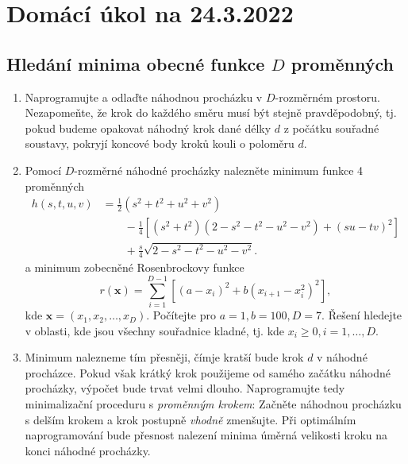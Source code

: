 \documentclass[a4paper,11pt,twoside]{article}
\def\vector#1{\boldsymbol{#1}}								%
\begin{document}
\section*{Domácí úkol na 24.3.2022}
\subsection*{Hledání minima obecné funkce $D$ proměnných}
\begin{enumerate}
    \item Naprogramujte a odlaďte náhodnou procházku v $D$-rozměrném prostoru.
        Nezapomeňte, že krok do každého směru musí být stejně pravděpodobný, tj. pokud budeme opakovat náhodný krok dané délky $d$ z počátku souřadné soustavy, pokryjí koncové body kroků kouli o poloměru $d$.

    \item Pomocí $D$-rozměrné náhodné procházky nalezněte minimum funkce 4 proměnných
        \begin{align*}
            h(s,t,u,v)&=\frac{1}{2}\left(s^2+t^2+u^2+v^2\right)\\
                &\qquad-\frac{1}{4}\left[\left(s^2+t^2\right)\left(2-s^2-t^2-u^2-v^2\right)+\left(su-tv\right)^2\right]\\
                &\qquad+\frac{s}{4}\sqrt{2-s^2-t^2-u^2-v^2}.
        \end{align*}
        a minimum zobecněné Rosenbrockovy funkce
        \begin{equation*}
            r(\vector{x})=\sum_{i=1}^{D-1}\left[\left(a-x_{i}\right)^{2}+b\left(x_{i+1}-x_{i}^{2}\right)^2\right],
        \end{equation*}
        kde $\vector{x}=(x_1,x_2,\dotsc,x_D)$. Počítejte pro $a=1, b=100, D=7$.
        Řešení hledejte v oblasti, kde jsou všechny souřadnice kladné, tj. kde $x_{i}\geq0,i=1,\dotsc,D$.

    \item Minimum nalezneme tím přesněji, čímje kratší bude krok $d$ v náhodné procházce.
        Pokud však krátký krok použijeme od samého začátku náhodné procházky, výpočet bude trvat velmi dlouho.
        Naprogramujte tedy minimalizační proceduru s \emph{proměnným krokem}: Začněte náhodnou procházku s delším krokem a krok postupně \emph{vhodně} zmenšujte.
        Při optimálním naprogramování bude přesnost nalezení minima úměrná velikosti kroku na konci náhodné procházky.
\end{enumerate}
\end{document}
